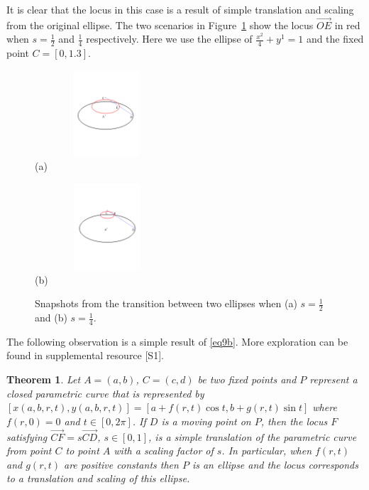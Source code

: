 \documentclass[12pt,a4paper]{article}%
\newtheorem{theorem}{Theorem}
\begin{document}
It is clear that the locus in this case is a result of simple translation and
scaling from the original ellipse. The two scenarios in Figure~\ref{fig4}
show the locus $\overrightarrow{OE}$ in red when $s=\frac{1}{2}$ and
$\frac{1}{4}$ respectively.
Here we use the ellipse of $\frac{x^{2}}{4}+y^{1}=1$ and the fixed point $C=[0,1.3]$.

\begin{figure}[htpb]
\begin{center}
\parbox[b]{2.2in}{\begin{center}
\includegraphics[natheight=2.242300in,natwidth=3.740400in,height=1.2577in,width=2.088in]{exercise2.pdf}
 \\ (a)
\end{center}}
\qquad
\parbox[b]{2.2in}{\begin{center}
\includegraphics[natheight=2.188200in,natwidth=3.692500in,height=1.2631in,width=2.1208in]{exercise2(b).pdf}
 \\ (b)
\end{center}}
\end{center}
\caption{Snapshots from the transition between two ellipses when (a) $s=\frac{1}{2}$ and (b) $s=\frac{1}{4}$.}
\label{fig4}
\end{figure}

The following observation is a simple result of \ref{eq9b}. More exploration
can be found in supplemental resource [S1].

\begin{theorem}
Let $A=\left(  a,b\right)$, $C=(c,d)$ be two fixed points and $P$ represent a
closed parametric curve that is represented by
$[x(a,b,r,t), y(a,b,r,t)] = [a+f(r,t)\cos t, b+g(r,t)\sin t]$ where $f(r,0)=0$
and $t\in[0, 2\pi]$. If $D$ is a moving point on $P$, then the locus $F$
satisfying $\overrightarrow{CF}=s\overrightarrow{CD}$, $s\in[0,1]$, is a
simple translation of the parametric curve from point $C$ to point $A$ with a
scaling factor of $s$. In particular, when $f(r,t)$ and $g(r,t)$ are positive constants
then $P$ is an ellipse and the locus corresponds to a translation and scaling of this ellipse.
\end{theorem}
\end{document}
